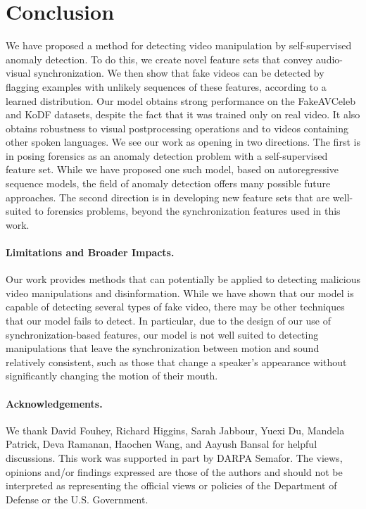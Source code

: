 \documentclass[10pt,twocolumn,letterpaper]{article}
\newcommand{\mypar}[1]{\vspace{-3mm}\paragraph{#1}}
\begin{document}
\section{Conclusion}
We have proposed a method for detecting video manipulation by self-supervised anomaly detection. To do this, we create novel feature sets that convey audio-visual synchronization. We then show that fake videos can be detected by flagging examples with unlikely sequences of these features, according to a learned distribution. Our model obtains strong performance on the FakeAVCeleb and KoDF datasets, despite the fact that it was trained only on real video. It also obtains robustness to visual postprocessing operations and to videos containing other spoken languages. We see our work as opening in two directions. The first is in posing forensics as an anomaly detection problem with a self-supervised feature set. While we have proposed one such model, based on autoregressive sequence models, the field of anomaly detection offers many possible future approaches. The second direction is in developing new feature sets that are well-suited to forensics problems, beyond the synchronization features used in this work. 






\mypar{Limitations and Broader Impacts. } Our work provides methods that can potentially be applied to detecting malicious video manipulations and disinformation. While we have shown that our model is capable of detecting several types of fake video, there may be other techniques that our model fails to detect. In particular, due to the design of our use of synchronization-based features, our model is not well suited to detecting manipulations that leave the synchronization between motion and sound relatively consistent, such as those that change a speaker's appearance without significantly changing the motion of their mouth. 

\mypar{Acknowledgements.} We thank David Fouhey, Richard Higgins, Sarah Jabbour, Yuexi Du, Mandela Patrick, Deva Ramanan, Haochen Wang, and Aayush Bansal for helpful discussions. This work was supported in part by DARPA Semafor. The views, opinions and/or findings expressed are those of the authors and should not be interpreted as representing the official views or policies of the Department of Defense or the U.S. Government. 




 
{\small


}
\end{document}
